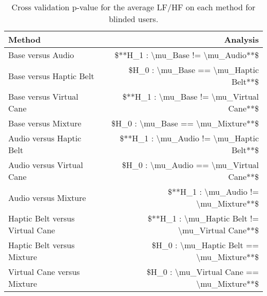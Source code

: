 
\begin{table}[!htb]
\centering
\caption{Cross validation p-value for the average LF/HF on each method for blinded users.}
\label{tab:lsd_average_lfhf}
\begin{tabular}{lr}
\toprule
                         Method &                                        Analysis \\
\midrule
              Base versus Audio &               \$**H\_1 : \textbackslash mu\_Base != \textbackslash mu\_Audio**\$ \\
        Base versus Haptic Belt &           \$H\_0 : \textbackslash mu\_Base == \textbackslash mu\_Haptic Belt**\$ \\
       Base versus Virtual Cane &        \$**H\_1 : \textbackslash mu\_Base != \textbackslash mu\_Virtual Cane**\$ \\
            Base versus Mixture &               \$H\_0 : \textbackslash mu\_Base == \textbackslash mu\_Mixture**\$ \\
       Audio versus Haptic Belt &        \$**H\_1 : \textbackslash mu\_Audio != \textbackslash mu\_Haptic Belt**\$ \\
      Audio versus Virtual Cane &         \$H\_0 : \textbackslash mu\_Audio == \textbackslash mu\_Virtual Cane**\$ \\
           Audio versus Mixture &            \$**H\_1 : \textbackslash mu\_Audio != \textbackslash mu\_Mixture**\$ \\
Haptic Belt versus Virtual Cane & \$**H\_1 : \textbackslash mu\_Haptic Belt != \textbackslash mu\_Virtual Cane**\$ \\
     Haptic Belt versus Mixture &        \$H\_0 : \textbackslash mu\_Haptic Belt == \textbackslash mu\_Mixture**\$ \\
    Virtual Cane versus Mixture &       \$H\_0 : \textbackslash mu\_Virtual Cane == \textbackslash mu\_Mixture**\$ \\
\bottomrule
\end{tabular}
\end{table}

